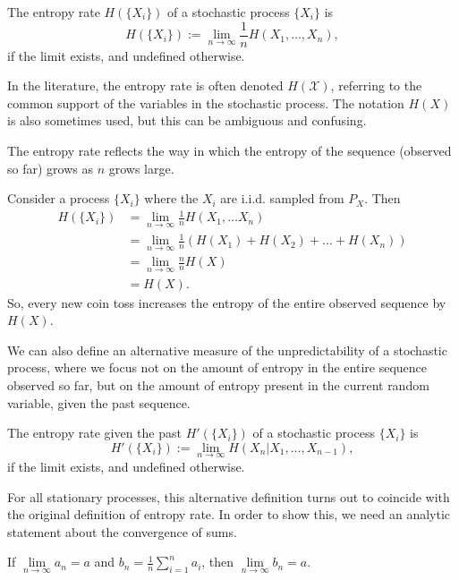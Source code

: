 \begin{definition}
The entropy rate $H(\{X_i\})$ of a stochastic process $\{X_i\}$ is
\[
H(\{X_i\}) := \lim_{n \to \infty} \frac{1}{n} H(X_1, \dots, X_n),
\]
if the limit exists, and undefined otherwise.
\end{definition}
In the literature, the entropy rate is often denoted $H(\mathcal{X})$, referring to the common support of the variables in the stochastic process. The notation $H(X)$ is also sometimes used, but this can be ambiguous and confusing.

The entropy rate reflects the way in which the entropy of the sequence (observed so far) grows as $n$ grows large.

\begin{example}
Consider a process $\{X_i\}$ where the $X_i$ are i.i.d. sampled from $P_X$. Then
\begin{align*}
H(\{X_i\}) &= \lim_{n \to \infty} \frac{1}{n} H(X_1, \dots X_n)\\
&= \lim_{n \to \infty} \frac{1}{n} \left( H(X_1) + H(X_2) + \ldots + H(X_n) \right)\\
&= \lim_{n \to \infty} \frac{n}{n} H(X)\\
&= H(X).
\end{align*}
So, every new coin toss increases the entropy of the entire observed sequence by $H(X)$.
\end{example}

We can also define an alternative measure of the unpredictability of a stochastic process, where we focus not on the amount of entropy in the entire sequence observed so far, but on the amount of entropy present in the current random variable, given the past sequence.

\begin{definition}
The entropy rate given the past $H'(\{X_i\})$ of a stochastic process $\{X_i\}$ is
\[
H'(\{X_i\}) := \lim_{n \to \infty} H(X_n | X_1, \dots, X_{n-1}),
\]
if the limit exists, and undefined otherwise.
\end{definition}
For all stationary processes, this alternative definition turns out to coincide with the original definition of entropy rate. In order to show this, we need an analytic statement about the convergence of sums.

\begin{theorem}\label{lem:cesaro}
If $\lim\limits_{n \to \infty} a_n = a$ and $b_n = \frac{1}{n} \sum_{i=1}^n a_i$, then $\lim\limits_{n \to \infty} b_n = a$.
\end{theorem}

